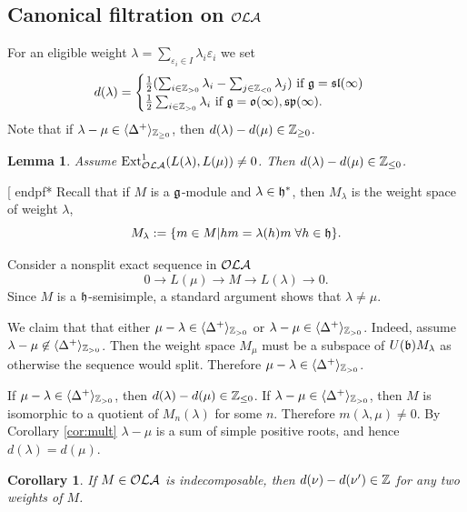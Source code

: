 \documentclass[12pt]{amsart}
\makeatletter
\def\mathbb{\Bbb}
\def\mathfrak{\frak}
\newenvironment{proof}{%
         \@ifnextchar[{%
                       \expandafter\let\expandafter\end@proof
                         \csname endpf*\endcsname
                         \my@proof
                      }{\let\end@proof\endpf\pf}%
        }{\end@proof}
\def\my@proof[#1]{\@nameuse{pf*}{#1}}
\def\mathcal{\cal}
\def\@putname#1#2#3#4{\def\@@ref{#3}\let\old@bf\bf
        \def\bf##1{\old@bf\if?\noexpand##1?{#4}\else##1\fi}%
        #1{#2}%
        \let\bf\old@bf}
\def\@putname#1#2#3#4{\def\@@ref{#3}\let\old@bf\bf    %
        \let\old@reset@font\reset@font                  %
        \def\bf##1{\old@bf\if?\noexpand##1?{#4}\else##1\fi}%
        \def\reset@font##1##2{\old@reset@font##1\if?\noexpand##2?{#4}\else##2\fi}#1{#2}%
        \let\bf\old@bf\let\reset@font\old@reset@font}
\let\my@ref=\ref
\def\ref#1{\@putname\my@ref{#1}{#1}{\tiny\rm\@@ref}}
\theoremstyle{plain} %
\numberwithin{equation}{section}
\theoremstyle{definition}
\theoremstyle{remark}
\theoremstyle{plain} %
\newtheorem{lemma}[definition]{Lemma}
\newtheorem{corollary}[definition]{Corollary}
\newcommand{\fg}{\mathfrak{g}}
\newcommand{\fb}{\mathfrak{b}}
\newcommand{\fh}{\mathfrak{h}}
\makeatother
\begin{document}
\subsection{Canonical filtration on $\mathcal{OLA}$ } For an eligible weight $\lambda=\sum_{\varepsilon_i\in I}\lambda_i\varepsilon_i$ we set
$$d(\lambda)=\begin{cases}\frac{1}{2}(\sum_{i\in \mathbb{Z}_{>0}}\lambda_i-\sum_{j\in \mathbb{Z}_{<0}}\lambda_j)\,\,\text{if}\,\, \fg=\mathfrak{sl}(\infty)\\
  \frac{1}{2}\sum_{i\in \mathbb{Z}_{>0}}\lambda_i\,\,\text{if}\,\, \fg=\mathfrak{o}(\infty), \mathfrak{sp}(\infty).\end{cases}$$
Note that if $\lambda-\mu\in \langle\Delta^+\rangle_{\mathbb{Z}_{\geq 0}}$, then $d(\lambda)-d(\mu)\in\mathbb Z_{\geq 0}$.
\begin{lemma}\label{lem:ext} Assume $\operatorname{Ext}_{\mathcal{OLA}}^1(L(\lambda),L(\mu))\neq 0$. Then $d(\lambda)-d(\mu)\in\mathbb Z_{\leq 0}$.
\end{lemma}
\begin{proof}  Recall that if $M$ is   a  $\fg$-module and $\lambda\in\fh^*$, then $M_\lambda$ is the weight space of  weight  $\lambda$,  $$ M_{\lambda}:=\{m\in M| hm=\lambda(h)m \; \forall h\in \fh\}.$$       

    Consider a nonsplit exact sequence in $\mathcal{OLA}$
  $$0\to L(\mu)\to M\to L(\lambda)\to 0. $$
  Since $M$ is a $\fh$-semisimple, a standard argument shows that $\lambda\neq\mu$.

  We claim that that either  $\mu-\lambda\in  \mathbb \langle\Delta^+\rangle_{\mathbb{Z}_{> 0}}$ or
  $\lambda-\mu\in  \mathbb  \langle\Delta^+\rangle_{\mathbb{Z}_{> 0}}$. Indeed, assume $\lambda-\mu\not\in \mathbb \langle\Delta^+\rangle_{\mathbb{Z}_{> 0}}$. Then  the weight space $M_\mu$ must be a subspace of $U(\fb)M_\lambda$ as otherwise  the sequence would split. Therefore
  $\mu-\lambda\in  \mathbb \langle\Delta^+\rangle_{\mathbb{Z}_{> 0}}$.

  If  $\mu-\lambda\in  \mathbb \langle\Delta^+\rangle_{\mathbb{Z}_{> 0}}$, then $d(\lambda)-d(\mu)\in\mathbb Z_{\leq 0}$. If  $\lambda-\mu\in  \mathbb  \langle\Delta^+\rangle_{\mathbb{Z}_{> 0}}$, then $M$ is isomorphic to a quotient of $M_n(\lambda)$ for some $n$. Therefore
  $m(\lambda,\mu)\neq 0$. By Corollary \ref{cor:mult}  $\lambda-\mu$ is a sum of simple positive roots, and hence $d(\lambda)=d(\mu)$.
\end{proof}

\begin{corollary}\label{cor:ind} If $M\in\mathcal{OLA}$ is indecomposable, then $d(\nu)-d(\nu')\in \mathbb Z$ for any two weights of $M$.
\end{corollary}
\end{document}

